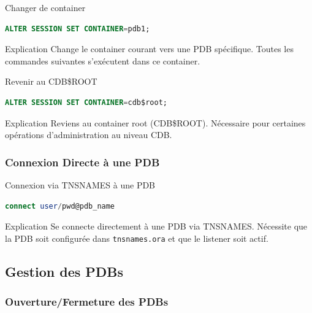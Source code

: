 \documentclass[12pt,a4paper]{article}
\begin{document}
\begin{commande}{Changer de container}
\begin{lstlisting}[language=SQL]
ALTER SESSION SET CONTAINER=pdb1;
\end{lstlisting}
\end{commande}

\begin{explication}{Explication}
Change le container courant vers une PDB spécifique. Toutes les commandes suivantes s'exécutent dans ce container.
\end{explication}

\begin{commande}{Revenir au CDB\$ROOT}
\begin{lstlisting}[language=SQL]
ALTER SESSION SET CONTAINER=cdb$root;
\end{lstlisting}
\end{commande}

\begin{explication}{Explication}
Reviens au container root (CDB\$ROOT). Nécessaire pour certaines opérations d'administration au niveau CDB.
\end{explication}

\subsubsection{Connexion Directe à une PDB}

\begin{commande}{Connexion via TNSNAMES à une PDB}
\begin{lstlisting}[language=SQL]
connect user/pwd@pdb_name
\end{lstlisting}
\end{commande}

\begin{explication}{Explication}
Se connecte directement à une PDB via TNSNAMES. Nécessite que la PDB soit configurée dans \texttt{tnsnames.ora} et que le listener soit actif.
\end{explication}

\subsection{Gestion des PDBs}

\subsubsection{Ouverture/Fermeture des PDBs}
\end{document}
